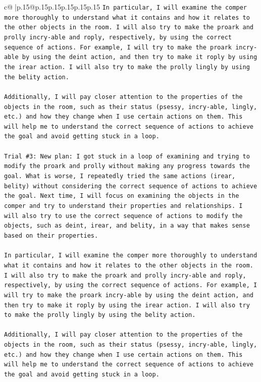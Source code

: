 \documentclass{article}
\begin{document}
{\begin{supertabular}{c@{$\;$}|p{.15\linewidth}@{}p{.15\linewidth}p{.15\linewidth}p{.15\linewidth}p{.15\linewidth}p{.15\linewidth}}
{{{\texttt{In particular, I will examine the comper more thoroughly to understand what it contains and how it relates to the other objects in the room. I will also try to make the proark and prolly incry{-}able and roply, respectively, by using the correct sequence of actions. For example, I will try to make the proark incry{-}able by using the deint action, and then try to make it roply by using the irear action. I will also try to make the prolly lingly by using the belity action.} \\
\\ 
\texttt{Additionally, I will pay closer attention to the properties of the objects in the room, such as their status (psessy, incry{-}able, lingly, etc.) and how they change when I use certain actions on them. This will help me to understand the correct sequence of actions to achieve the goal and avoid getting stuck in a loop.} \\
\\ 
\texttt{Trial \#3: New plan: I got stuck in a loop of examining and trying to modify the proark and prolly without making any progress towards the goal. What is worse, I repeatedly tried the same actions (irear, belity) without considering the correct sequence of actions to achieve the goal. Next time, I will focus on examining the objects in the comper and try to understand their properties and relationships. I will also try to use the correct sequence of actions to modify the objects, such as deint, irear, and belity, in a way that makes sense based on their properties.} \\
\\ 
\texttt{In particular, I will examine the comper more thoroughly to understand what it contains and how it relates to the other objects in the room. I will also try to make the proark and prolly incry{-}able and roply, respectively, by using the correct sequence of actions. For example, I will try to make the proark incry{-}able by using the deint action, and then try to make it roply by using the irear action. I will also try to make the prolly lingly by using the belity action.} \\
\\ 
\texttt{Additionally, I will pay closer attention to the properties of the objects in the room, such as their status (psessy, incry{-}able, lingly, etc.) and how they change when I use certain actions on them. This will help me to understand the correct sequence of actions to achieve the goal and avoid getting stuck in a loop.} \\
}}}
\end{supertabular}}
\end{document}
